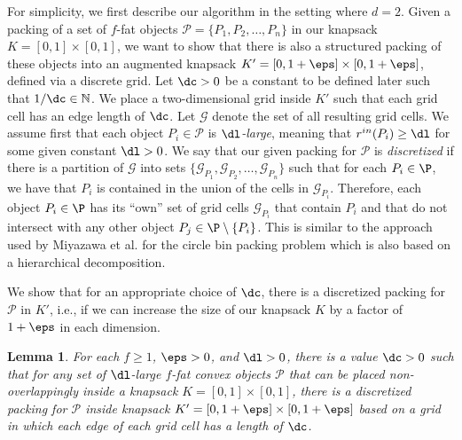 \documentclass[10pt,a4paper]{article}
\newtheorem{lemma}{Lemma}[section]
\theoremstyle{plain}
\theoremstyle{plain}
\theoremstyle{plain}
\theoremstyle{definition}
\newcommand{\ari}[1]{#1}
\newcommand{\ag}[1]{#1}
\begin{document}
For simplicity, we first describe our algorithm in the setting where $d=2$.
Given a packing of a set of $f$-fat objects $\mathcal{P}=\{P_1, P_2, \dots, P_n\}$ in our knapsack $K=[0, 1] \times [0, 1]$, we want to show that there is also a structured packing of these objects \ari{into an augmented knapsack $K'=[0, 1+\eps]\times [0, 1+\eps]$}, defined via a discrete grid. Let $\dc>0$ be a constant to be defined later such that $1/\dc \in \mathbb{N}$. We place a two-dimensional grid inside \ari{$K'$} such that each grid cell has an edge length of $\dc$. Let $\mathcal{G}$ denote the set of all resulting grid cells. We assume first that each object $P_i \in \mathcal{P}$ is \emph{$\dl$-large}, meaning that $r^{in}(P_i) \ge \dl$ for some given constant $\dl>0$. We say that our given packing for $\mathcal{P}$ is {\em discretized} if there is a partition of $\mathcal{G}$ into sets $\{\mathcal{G}_{P_1}, \mathcal{G}_{P_2}, \dots, \mathcal{G}_{P_n}\}$ such that for each $P_i \in \P$, we have that $P_i$ is contained in the union of the cells in $\mathcal{G}_{P_i}$. Therefore, each object $P_i \in \P$ has its ``own'' set of grid cells $\mathcal{G}_{P_i}$ that contain $P_i$ and that do not intersect with any other object $P_j \in \P \setminus \{P_i\}$. 
{This is similar to the approach used by Miyazawa et al. \cite{MiyazawaPSSW16} for the circle bin packing problem which is also based on a hierarchical decomposition.}


\ari{We show that for an appropriate choice of $\dc$, there is a discretized packing for $\mathcal{P}$ in $K'$, i.e., if we can increase the size of our knapsack $K$ by a factor of $1+\eps$ in each dimension.}

\begin{lemma}%
	\label{lem:fatdisc}
	For each $f \ge 1$, $\eps>0$, and $\dl>0$, there is a value $\dc>0$ such that for any set of $\dl$-large $f$-fat convex objects $\mathcal{P}$
	that can be placed non-overlappingly inside a knapsack $K=[0, 1] \times [0, 1]$, there is a discretized packing
	for $\mathcal{P}$ inside knapsack $\ag{K'= } [0, 1+\eps] \times [0, 1+\eps]$
	based on a grid in which each edge of each grid cell has a length of $\dc$.
\end{lemma}
\end{document}
